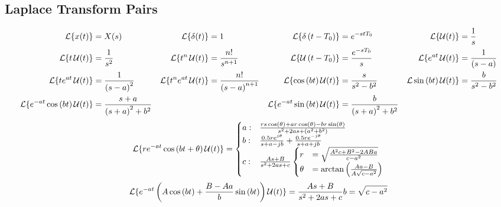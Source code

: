 	\subsection*{Laplace Transform Pairs} \label{subsec:Laplace Transform Pairs}
		\begin{align*}
			\operatorname{\mathcal{L}} \lbrace x (t) \rbrace &= X(s) & \operatorname{\mathcal{L}} \lbrace \delta (t) \rbrace &= 1 & \operatorname{\mathcal{L}} \lbrace \delta \left( t-T_{0} \right) \rbrace &= e^{-stT_{0}} & \operatorname{\mathcal{L}} \lbrace \operatorname{\mathcal{U}} (t) \rbrace &= \frac{1}{s} \\
			\operatorname{\mathcal{L}} \lbrace t \operatorname{\mathcal{U}} (t) \rbrace &= \frac{1}{s^{2}} & \operatorname{\mathcal{L}} \lbrace t^{n}\operatorname{\mathcal{U}} (t) \rbrace &= \frac{n!}{s^{n+1}} & \operatorname{\mathcal{L}} \lbrace \operatorname{\mathcal{U}} \left( t-T_{0} \right) \rbrace &= \frac{e^{-sT_{0}}}{s} & \operatorname{\mathcal{L}} \lbrace e^{at} \operatorname{\mathcal{U}} (t) \rbrace &= \frac{1}{\left( s-a \right)} \\
			\operatorname{\mathcal{L}} \lbrace t e^{at} \operatorname{\mathcal{U}} (t) \rbrace &= \frac{1}{\left( s-a \right)^{2}} & \operatorname{\mathcal{L}} \lbrace t^{n} e^{at} \operatorname{\mathcal{U}} (t) \rbrace &= \frac{n!}{\left( s-a \right)^{n+1}} & \operatorname{\mathcal{L}} \lbrace \cos \left( bt \right) \operatorname{\mathcal{U}} (t) \rbrace &= \frac{s}{s^{2}-b^{2}} & \operatorname{\mathcal{L}} \sin \left( bt \right) \operatorname{\mathcal{U}} (t) \rbrace &= \frac{b}{s^{2}-b^{2}} \\
			\operatorname{\mathcal{L}} \lbrace e^{-at} \cos \left( bt \right) \operatorname{\mathcal{U}} (t) \rbrace &= \frac{s+a}{\left( s+a \right)^{2} + b^{2}} &&& \operatorname{\mathcal{L}} \lbrace e^{-at} \sin \left( bt \right) \operatorname{\mathcal{U}} (t) \rbrace &= \frac{b}{\left( s+a \right)^{2} + b^{2}} \\
		\end{align*}
		\begin{equation*}
			\operatorname{\mathcal{L}} \lbrace r e^{-at} \cos \left( bt + \theta \right) \operatorname{\mathcal{U}} (t) \rbrace =
				\begin{cases}
					a: & \frac{rs \cos \left( \theta \right) + ar \cos \left( \theta \right) - br \sin \left( \theta \right)}{s^{2} + 2as + \left( a^{2} + b^{2} \right)} \\
					b: & \frac{0.5 re^{j \theta}}{s+a-jb} + \frac{0.5 re^{-j \theta}}{s+a+jb} \\
					c: & \frac{As+B}{s^{2} + 2as + c}
						\begin{cases}
							r &=\sqrt{\frac{A^{2}c + B^{2} -2ABa}{c-a^{2}}} \\
							\theta &= \arctan \left( \frac{Aa-B}{A \sqrt{c-a^{2}}} \right)
						\end{cases} \\
				\end{cases}
		\end{equation*}
		\begin{equation*}
			\operatorname{\mathcal{L}} \lbrace e^{-at} \left( A \cos \left( bt \right) + \frac{B-Aa}{b} \sin \left( bt \right) \right) \operatorname{\mathcal{U}} (t) \rbrace = \frac{As+B}{s^{2} + 2as + c} \\
			b = \sqrt{c-a^{2}}
		\end{equation*}